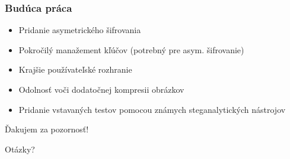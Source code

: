 \documentclass{beamer}
\begin{document}
\begin{frame}
    \frametitle{Budúca práca}
    \begin{itemize}
        \item Pridanie asymetrického šifrovania
        \item Pokročilý manažement kľúčov (potrebný pre asym. šifrovanie)
        \item Krajšie používateľské rozhranie
        \item Odolnosť voči dodatočnej kompresii obrázkov
        \item Pridanie vstavaných testov pomocou známych steganalytických nástrojov
    \end{itemize}
    
\end{frame}

\begin{frame}
    \begin{center}
        \Large Ďakujem za pozornosť!
    \end{center}
\end{frame}

\begin{frame}
    \begin{center}
        \Large
        Otázky?
    \end{center}
\end{frame}
\end{document}
